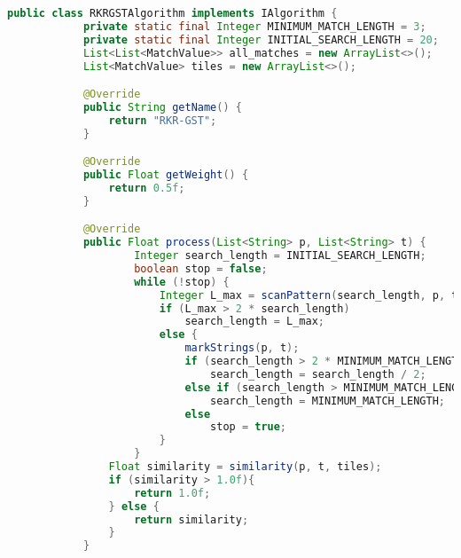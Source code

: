     \newpage
    \begin{lstlisting}[language=java]
        public class RKRGSTAlgorithm implements IAlgorithm {
            private static final Integer MINIMUM_MATCH_LENGTH = 3;        
            private static final Integer INITIAL_SEARCH_LENGTH = 20;
            List<List<MatchValue>> all_matches = new ArrayList<>();
            List<MatchValue> tiles = new ArrayList<>();

            @Override
            public String getName() {
                return "RKR-GST";
            }

            @Override
            public Float getWeight() {
                return 0.5f;
            }

            @Override
            public Float process(List<String> p, List<String> t) {
                    Integer search_length = INITIAL_SEARCH_LENGTH;
                    boolean stop = false;
                    while (!stop) {
                        Integer L_max = scanPattern(search_length, p, t);
                        if (L_max > 2 * search_length)
                            search_length = L_max;
                        else {
                            markStrings(p, t);
                            if (search_length > 2 * MINIMUM_MATCH_LENGTH)
                                search_length = search_length / 2;
                            else if (search_length > MINIMUM_MATCH_LENGTH)
                                search_length = MINIMUM_MATCH_LENGTH;
                            else
                                stop = true;
                        }
                    }
                Float similarity = similarity(p, t, tiles);
                if (similarity > 1.0f){
                    return 1.0f;
                } else {
                    return similarity;
                }
            }


\end{lstlisting}
